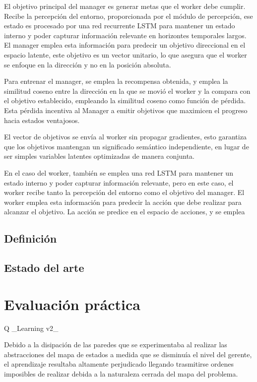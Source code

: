 \documentclass[letterpaper]{article} %
\begin{document}
El objetivo principal del manager es generar metas que el worker debe cumplir. Recibe la percepción
del entorno, proporcionada por el módulo de percepción, ese estado es procesado por una red recurrente LSTM
para mantener un estado interno y poder capturar información relevante en horizontes temporales largos.
El manager emplea esta información para predecir un objetivo direccional en el espacio latente, este objetivo
es un vector unitario, lo que asegura que el worker se enfoque en la dirección y no en la posición absoluta.

Para entrenar el manager, se emplea la recompensa obtenida, y emplea la similitud coseno entre la dirección en la que 
se movió el worker y la compara con el objetivo establecido, empleando la similitud coseno como función de pérdida.
Esta pérdida incentiva al Manager a emitir objetivos que maximicen el progreso hacia estados ventajosos.

El vector de objetivos se envía al worker sin propagar gradientes, esto garantiza que los objetivos 
mantengan un significado semántico independiente, en lugar de ser simples variables latentes optimizadas de manera conjunta.

En el caso del worker, también se emplea una red LSTM para mantener un estado interno y poder capturar información relevante,
pero en este caso, el worker recibe tanto la percepción del entorno como el objetivo del manager. El worker emplea esta información
para predecir la acción que debe realizar para alcanzar el objetivo. La acción se predice en el espacio de acciones, y se emplea


\subsection{Definición}

\subsection{Estado del arte}

\section{Evaluación práctica}

Q _Learning  v2_

Debido a la disipación de las paredes que se experimentaba al realizar las abstracciones del mapa de estados a medida que se disminuía el nivel del gerente, el aprendizaje resultaba altamente perjudicado llegando trasmitirse ordenes imposibles de realizar debida a la naturaleza cerrada del mapa del problema.
\end{document}

